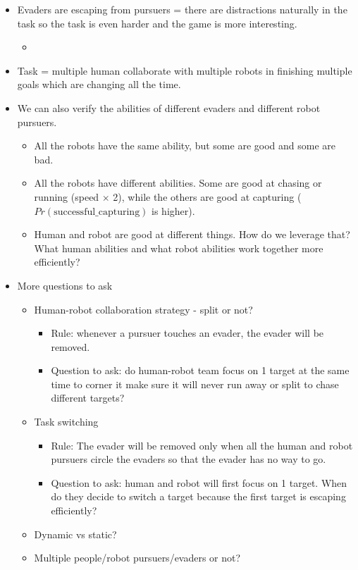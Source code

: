 \begin{itemize}
\begin{itemize}
        \item Evaders are escaping from pursuers = there are distractions naturally in the task so the task is even harder and the game is more interesting.
        \begin{itemize}
            \item {}
        \end{itemize}

        \item Task = multiple human collaborate with multiple robots in finishing multiple goals which are changing all the time.
        \item We can also verify the abilities of different evaders and different robot pursuers.
        \begin{itemize}
            \item All the robots have the same ability, but some are good and some are bad.
            \item All the robots have different abilities. Some are good at chasing or running (speed $\times$ 2), while the others are good at capturing ($Pr(\text{successful\_capturing})$ is higher).
            \item Human and robot are good at different things. How do we leverage that? What human abilities and what robot abilities work together more efficiently?
        \end{itemize}

        \item More questions to ask
        \begin{itemize}
            \item Human-robot collaboration strategy - split or not?
            \begin{itemize}
                \item Rule: whenever a pursuer touches an evader, the evader will be removed.
                \item Question to ask: do human-robot team focus on 1 target at the same time to corner it make sure it will never run away or split to chase different targets?
            \end{itemize}
            \item Task switching
            \begin{itemize}
                \item Rule: The evader will be removed only when all the human and robot pursuers circle the evaders so that the evader has no way to go.
                \item Question to ask: human and robot will first focus on 1 target. When do they decide to switch a target because the first target is escaping efficiently?
            \end{itemize}
            \item Dynamic vs static?
            \item Multiple people/robot pursuers/evaders or not?
        \end{itemize}
    \end{itemize}
\end{itemize}







